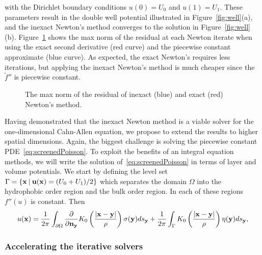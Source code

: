 with the Dirichlet boundary conditions $u(0) = U_0$ and $u(1) = U_1$.
These parameters result in the double well potential illustrated in
Figure~\ref{fig:well}(a), and the inexact Newton's method converges to
the solution in Figure~\ref{fig:well}(b). Figure~\ref{fig:residuals}
shows the max norm of the residual at each Newton iterate when using
the exact second derivative (red curve) and the piecewise constant
approximate (blue curve). As expected, the exact Newton's requires less
iterations, but applying the inexact Newton's method is much cheaper
since the $\tilde{f}''$ is piecewise constant.
\begin{figure}
  \centering
  
  \caption{\label{fig:residuals} The max norm of the residual of
  inexact (blue) and exact (red) Newton's method.}
\end{figure}

Having demonstrated that the inexact Newton method is a viable solver
for the one-dimensional Cahn-Allen equation, we propose to extend the
results to higher spatial dimensions. Again, the biggest challenge is
solving the piecewise constant PDE~\eqref{eq:screenedPoisson}. To
exploit the benefits of an integral equation methods, we will write the
solution of~\eqref{eq:screenedPoisson} in terms of layer and volume
potentials. We start by defining the level set $\Gamma = \{\mathbf{x} \:|\:
\mathbf{u}(\mathbf{x}) = (U_0 + U_1)/2 \}$ which separates the domain $\Omega$ into
the hydrophobic order region and the bulk order region. In each of these
regions $f''(u)$ is constant. Then
\begin{align*}
  u(\mathbf{x}) = \frac{1}{2\pi} \int_{\partial\Omega} \frac{\partial }{\partial \mathbf{n}_{\mathbf{y}}} K_0 \left(
    \frac{|\mathbf{x} - \mathbf{y}|}{\rho}\right) \sigma(\mathbf{y}) ds_{\mathbf{y}} + 
    \frac{1}{2\pi} \int_{\Gamma} K_0 \left(
    \frac{|\mathbf{x} - \mathbf{y}|}{\rho} \right) \eta(\mathbf{y}) ds_{\mathbf{y}},
\end{align*}



\subsubsection{Accelerating the iterative solvers}
\label{subsec:NumericalIssues}

